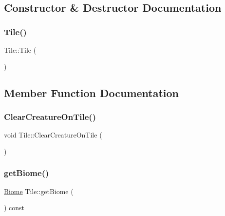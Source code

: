 \subsection{Constructor \& Destructor Documentation}
\mbox{\label{class_tile_aeeb5593bb6b75aae2edfcccbc84ab378}} 
\subsubsection{\texorpdfstring{Tile()}{Tile()}}
{\footnotesize\ttfamily Tile\+::\+Tile (\begin{DoxyParamCaption}{ }\end{DoxyParamCaption})}



\subsection{Member Function Documentation}
\mbox{\label{class_tile_a44269537d2d95251f5d6320f11afaf71}} 
\subsubsection{\texorpdfstring{Clear\+Creature\+On\+Tile()}{ClearCreatureOnTile()}}
{\footnotesize\ttfamily void Tile\+::\+Clear\+Creature\+On\+Tile (\begin{DoxyParamCaption}{ }\end{DoxyParamCaption})}

\mbox{\label{class_tile_a6750de19b8f92165d781374b5a327bb5}} 
\subsubsection{\texorpdfstring{get\+Biome()}{getBiome()}}
{\footnotesize\ttfamily \mbox{\hyperlink{class_biome}{Biome}} Tile\+::get\+Biome (\begin{DoxyParamCaption}{ }\end{DoxyParamCaption}) const}

\mbox{\label{class_tile_a5e1ec597a89119d8c3fc0c77cce38ef9}} 
